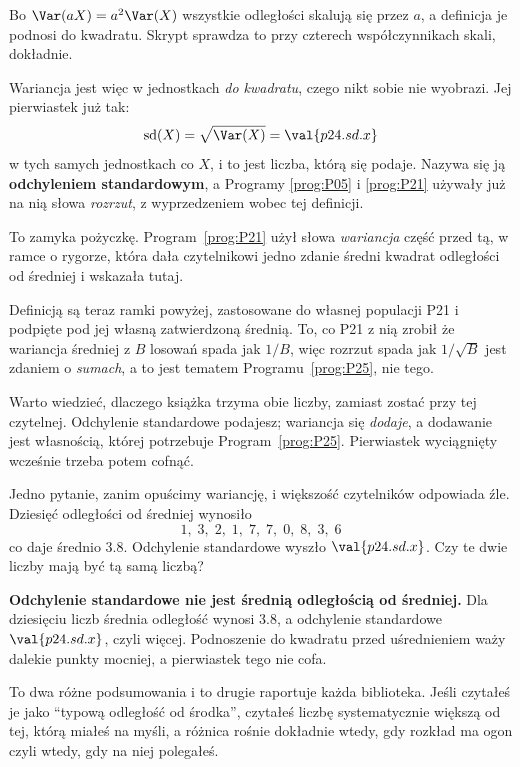 \begin{fr}

Bo $\Var(aX) = a^{2}\Var(X)$ \dash{} wszystkie odległości skalują się przez
$a$, a definicja je podnosi do kwadratu. Skrypt sprawdza to przy czterech
współczynnikach skali, dokładnie.

Wariancja jest więc w jednostkach \emph{do kwadratu}, czego nikt sobie nie
wyobrazi. Jej pierwiastek już tak:
\[ \operatorname{sd}(X) = \sqrt{\Var(X)} = \val{p24.sd.x} \]
w tych samych jednostkach co $X$, i to jest liczba, którą się podaje. Nazywa
się ją \textbf{odchyleniem standardowym}, a Programy \ref{prog:P05} i
\ref{prog:P21} używały już na nią słowa \emph{rozrzut}, z wyprzedzeniem wobec
tej definicji.
\end{fr}

\begin{fr}
To zamyka pożyczkę. Program~\ref{prog:P21} użył słowa \emph{wariancja} część
przed tą, w ramce o rygorze, która dała czytelnikowi jedno zdanie
\dash{} średni kwadrat odległości od średniej \dash{} i wskazała tutaj.

Definicją są teraz ramki powyżej, zastosowane do własnej populacji P21 i
podpięte pod jej własną zatwierdzoną średnią. To, co P21 z nią zrobił
\dash{} że wariancja średniej z $B$ losowań spada jak $1/B$, więc rozrzut
spada jak $1/\sqrt{B}$ \dash{} jest zdaniem o \emph{sumach}, a to jest tematem
Programu~\ref{prog:P25}, nie tego.

Warto wiedzieć, dlaczego książka trzyma obie liczby, zamiast zostać przy tej
czytelnej. Odchylenie standardowe podajesz; wariancja się \emph{dodaje}, a
dodawanie jest własnością, której potrzebuje Program~\ref{prog:P25}.
Pierwiastek wyciągnięty wcześnie trzeba potem cofnąć.

Jedno pytanie, zanim opuścimy wariancję, i większość czytelników odpowiada
źle. Dziesięć odległości od średniej wynosiło
\[ 1,\; 3,\; 2,\; 1,\; 7,\; 7,\; 0,\; 8,\; 3,\; 6 \]
co daje średnio $\num{3.8}$. Odchylenie standardowe wyszło
$\val{p24.sd.x}$. Czy te dwie liczby mają być tą samą liczbą?
\dotline
\nextframe
\end{fr}

\begin{fr}

\begin{trapbox}
\textbf{Odchylenie standardowe nie jest średnią odległością od średniej.}
Dla dziesięciu liczb średnia odległość wynosi $\num{3.8}$, a odchylenie
standardowe $\val{p24.sd.x}$, czyli więcej. Podnoszenie do kwadratu przed
uśrednieniem waży dalekie punkty mocniej, a pierwiastek tego nie cofa.

To dwa różne podsumowania i to drugie raportuje każda biblioteka. Jeśli
czytałeś je jako \enquote{typową odległość od środka}, czytałeś liczbę
systematycznie większą od tej, którą miałeś na myśli, a różnica rośnie
dokładnie wtedy, gdy rozkład ma ogon \dash{} czyli wtedy, gdy na niej
polegałeś.
\end{trapbox}
\end{fr}

